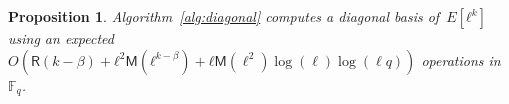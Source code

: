 \documentclass{lms}
\newtheorem{prop}[thm]{Proposition}
\def\cout#1{\mathsf{#1}}
\def\sfdiv{\mathsf{divide}}
\newcommand{\F}{\mathbb{F}}
\newcommand{\MM}{\cout{M}}
\newcommand{\RR}{\cout{R}}
\begin{document}
\begin{prop}\label{th:diagonal}
  Algorithm~\ref{alg:diagonal} computes a diagonal basis of~$E[ℓ^k]$
  using an expected
  $O(\RR(k-\beta) + ℓ^2\MM(ℓ^{k-β}) + ℓ\MM(\ell^2)\log(\ell)\log(\ell
  q))$ operations in $\F_q$.
\end{prop}
\end{document}
